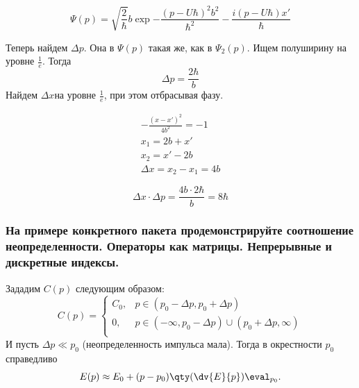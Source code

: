 \begin{equation}
	\Psi(p)=\sqrt{\frac{2}{\hbar}}b\exp{-\frac{(p-U\hbar)^2b^2}{\hbar^2}-\frac{i(p-U\hbar)x'}{\hbar} }
\end{equation}

Теперь найдем $\Delta p$. Она в $\Psi(p)$ такая же, как в $\Psi_2(p)$. Ищем полуширину на уровне $\frac{1}{e}$. Тогда
$$\Delta p=\frac{2\hbar}{b}$$
Найдем $\Delta x$на уровне $\frac1e$, при этом отбрасывая фазу.

\begin{gather*}
	-\frac{(x-x')^2}{4b^2}=-1 \\
	x_1=2b+x'\\
	x_2=x'-2b\\
	\Delta x= x_2-x_1=4b
\end{gather*}

$$\Delta x\cdot \Delta p=\frac{4b\cdot2\hbar}{b}=8\hbar  $$

\subsubsection{ {На примере конкретного пакета продемонстрируйте соотношение неопределенности. Операторы как матрицы. Непрерывные и дискретные индексы.} }

Зададим $C(p)$ следующим образом:
\begin{equation}
	C(p)=
	\begin{cases}
		C_0, & p \in (p_0- \Delta p, p_0+ \Delta p) \\
		0,   & p \in (-\infty, p_0- \Delta p)\cup(p_0+ \Delta p,\infty) \\
	\end{cases}
\end{equation}
И пусть $ \Delta p \ll p_0 $ (неопределенность импульса мала). Тогда в окрестности $p_0 $ справедливо
$$E(p)\approx  E_0+(p-p_0) \qty(\dv{E}{p})\eval_{p_0}.$$

